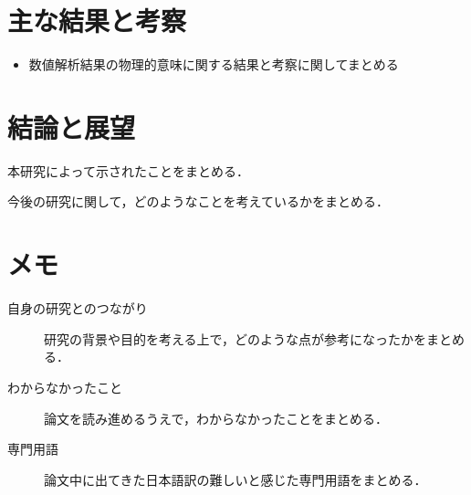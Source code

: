 \documentclass[12pt,a4paper]{jsarticle}
\begin{document}
\section{主な結果と考察}
\begin{itemize}[leftmargin=*]
  \item 数値解析結果の物理的意味に関する結果と考察に関してまとめる
\end{itemize}

\section{結論と展望}
\begin{description}[leftmargin=*]
  \item[結論] 本研究によって示されたことをまとめる．
  \item[展望] 今後の研究に関して，どのようなことを考えているかをまとめる．
\end{description}

\section{メモ}
\begin{description}
    \item[自身の研究とのつながり] 研究の背景や目的を考える上で，どのような点が参考になったかをまとめる．
    \item[わからなかったこと] 論文を読み進めるうえで，わからなかったことをまとめる．
    \item[専門用語] 論文中に出てきた日本語訳の難しいと感じた専門用語をまとめる．
\end{description}


\printbibliography[title=参考文献]
\end{document}
